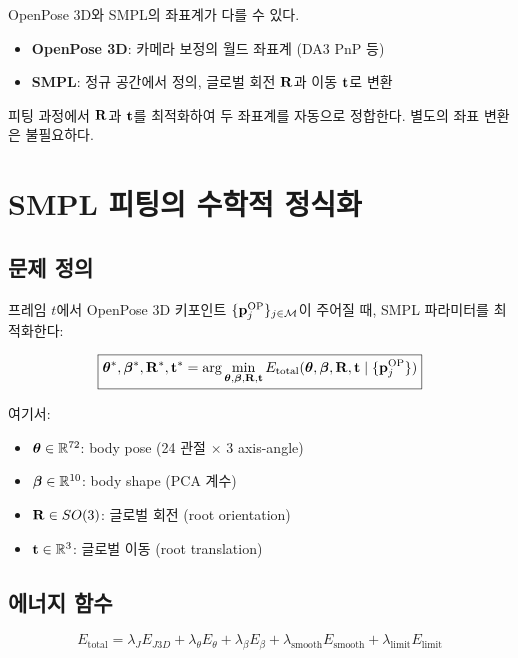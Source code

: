 \documentclass[11pt, a4paper]{report}
\begin{document}
\begin{importantnote}
OpenPose 3D와 SMPL의 좌표계가 다를 수 있다.
\begin{itemize}[nosep]
  \item \textbf{OpenPose 3D}: 카메라 보정의 월드 좌표계 (DA3 PnP 등)
  \item \textbf{SMPL}: 정규 공간에서 정의, 글로벌 회전 $\mathbf{R}$과 이동 $\mathbf{t}$로 변환
\end{itemize}
피팅 과정에서 $\mathbf{R}$과 $\mathbf{t}$를 최적화하여 두 좌표계를 자동으로 정합한다.
별도의 좌표 변환은 불필요하다.
\end{importantnote}


\chapter{SMPL 피팅의 수학적 정식화}
\label{ch:formulation}

\section{문제 정의}

프레임 $t$에서 OpenPose 3D 키포인트 $\{\mathbf{p}_j^{\text{OP}}\}_{j \in \mathcal{M}}$이 주어질 때,
SMPL 파라미터를 최적화한다:

\begin{equation}
\boxed{
\bm{\theta}^*, \bm{\beta}^*, \mathbf{R}^*, \mathbf{t}^* = \arg\min_{\bm{\theta}, \bm{\beta}, \mathbf{R}, \mathbf{t}}
E_{\text{total}}(\bm{\theta}, \bm{\beta}, \mathbf{R}, \mathbf{t} \mid \{\mathbf{p}_j^{\text{OP}}\})
}
\label{eq:total_objective}
\end{equation}

여기서:
\begin{itemize}[nosep]
  \item $\bm{\theta} \in \mathbb{R}^{72}$: body pose (24 관절 $\times$ 3 axis-angle)
  \item $\bm{\beta} \in \mathbb{R}^{10}$: body shape (PCA 계수)
  \item $\mathbf{R} \in SO(3)$: 글로벌 회전 (root orientation)
  \item $\mathbf{t} \in \mathbb{R}^3$: 글로벌 이동 (root translation)
\end{itemize}


\section{에너지 함수}

\begin{equation}
E_{\text{total}} = \lambda_{J} E_{J3D} + \lambda_\theta E_\theta + \lambda_\beta E_\beta
  + \lambda_{\text{smooth}} E_{\text{smooth}} + \lambda_{\text{limit}} E_{\text{limit}}
\label{eq:energy}
\end{equation}
\end{document}
